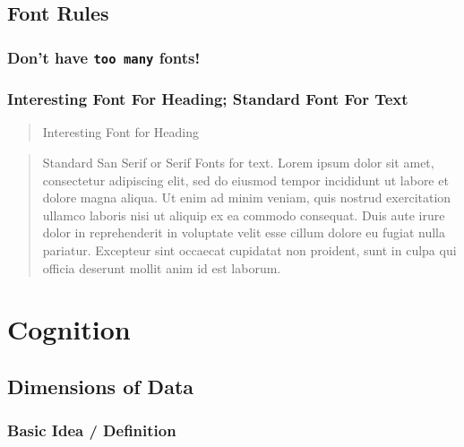 \documentclass[
]{article}
\begin{document}
\hypertarget{font-rules}{%
\subsection{Font Rules}\label{font-rules}}

\hypertarget{dont-have-too-many-fonts}{%
\subsubsection{\texorpdfstring{Don't have \texttt{too\ many}
fonts!}{Don't have too many fonts!}}\label{dont-have-too-many-fonts}}

\hypertarget{interesting-font-for-heading-standard-font-for-text}{%
\subsubsection{Interesting Font For Heading; Standard Font For
Text}\label{interesting-font-for-heading-standard-font-for-text}}

\begin{quote}
Interesting Font for Heading
\end{quote}

\begin{quote}
Standard San Serif or Serif Fonts for text. Lorem ipsum dolor sit amet,
consectetur adipiscing elit, sed do eiusmod tempor incididunt ut labore
et dolore magna aliqua. Ut enim ad minim veniam, quis nostrud
exercitation ullamco laboris nisi ut aliquip ex ea commodo consequat.
Duis aute irure dolor in reprehenderit in voluptate velit esse cillum
dolore eu fugiat nulla pariatur. Excepteur sint occaecat cupidatat non
proident, sunt in culpa qui officia deserunt mollit anim id est laborum.
\end{quote}

\hypertarget{cognition}{%
\section{Cognition}\label{cognition}}

\hypertarget{dimensions-of-data}{%
\subsection{Dimensions of Data}\label{dimensions-of-data}}

\hypertarget{basic-idea-definition}{%
\subsubsection{Basic Idea / Definition}\label{basic-idea-definition}}
\end{document}
